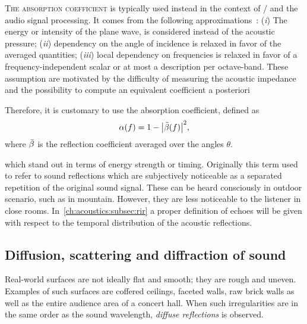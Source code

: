 \textsc{The absorption coefficient} is typically used instead in the context of \GA/ and the audio signal processing.
It comes from the following approximations~:
(\textit{i}) The energy or intensity of the plane wave, is considered instead of the acoustic pressure;
(\textit{ii}) dependency on the angle of incidence is relaxed in favor of the averaged quantities;
(\textit{iii}) local dependency on frequencies is relaxed in favor of a frequency-independent scalar or at most a description per octave-band.
These assumption are motivated by the difficulty of measuring the acoustic impedance
and the possibility to compute an equivalent coefficient a posteriori

Therefore, it is customary to use the absorption coefficient, defined as
\begin{equation}
    \absCoeff(f) = 1 - \abs{\bar{\reflCoeff}(f)}^2
    ,
\end{equation}
where $\bar{\beta}$ is the reflection coefficient averaged over the angles $\theta$.

 which stand out in terms of energy strength or timing.
Originally this term used to refer to sound reflections which are subjectively noticeable as a separated repetition of the original sound signal.
These can be heard consciously in outdoor scenario, such as in mountain. However, they are less noticeable to the listener in close rooms.
In~\cref{ch:acoustics:subsec:rir} a proper definition of echoes will be given with respect to the temporal distribution of the acoustic reflections.

\subsection{Diffusion, scattering and diffraction of sound}
Real-world surfaces are not ideally flat and smooth; they are rough and uneven.
Examples of such surfaces are coffered ceilings, faceted walls, raw brick walls as well as the entire audience area of a concert hall.
When such irregularities are in the same order as the sound wavelength, \textit{diffuse reflections} is observed.

